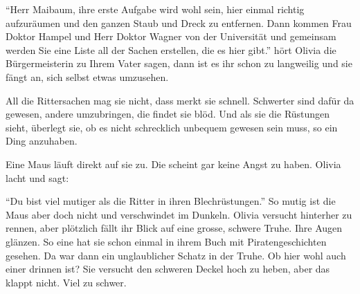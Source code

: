 \enquote{Herr Maibaum, ihre erste Aufgabe wird wohl sein, hier einmal richtig aufzuräumen und den ganzen Staub und Dreck zu entfernen. Dann kommen Frau Doktor Hampel und Herr Doktor Wagner von der Universität und gemeinsam werden Sie eine Liste all der Sachen erstellen, die es hier gibt.} hört Olivia die Bürgermeisterin zu Ihrem Vater sagen, dann ist es ihr schon zu langweilig und sie fängt an, sich selbst etwas umzusehen.

All die Rittersachen mag sie nicht, dass merkt sie schnell. Schwerter sind dafür da gewesen, andere umzubringen, die findet sie blöd. Und als sie die Rüstungen sieht, überlegt sie, ob es nicht schrecklich unbequem gewesen sein muss, so ein Ding anzuhaben. 

Eine Maus läuft direkt auf sie zu. Die scheint gar keine Angst zu haben. Olivia lacht und sagt:

\enquote{Du bist viel mutiger als die Ritter in ihren Blechrüstungen.} So mutig ist die Maus aber doch nicht und verschwindet im Dunkeln. Olivia versucht hinterher zu rennen, aber plötzlich fällt ihr Blick auf eine grosse, schwere Truhe. Ihre Augen glänzen. So eine hat sie schon einmal in ihrem Buch mit Piratengeschichten gesehen. Da war dann ein unglaublicher Schatz in der Truhe. Ob hier wohl auch einer drinnen ist? Sie versucht den schweren Deckel hoch zu heben, aber das klappt nicht. Viel zu schwer. 


